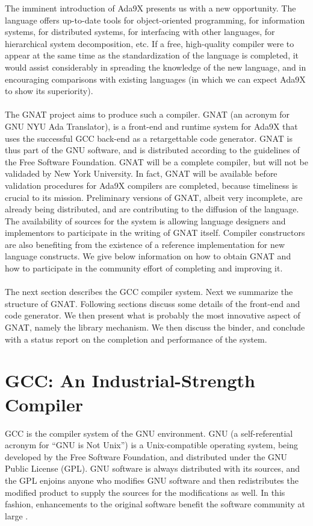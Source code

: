 The imminent introduction of Ada9X presents us with a new opportunity. The
language \cite{rm-9x} offers up-to-date tools for object-oriented
programming, for information systems, for distributed systems, for interfacing
with other languages, for hierarchical system decomposition, etc. If a free,
high-quality compiler were to appear at the same time as the standardization
of the language is completed, it would assist considerably in spreading the
knowledge of the new language, and in encouraging comparisons with existing
languages (in which we can expect Ada9X to show its superiority). 
\\ \\
The GNAT project aims to produce such a compiler. GNAT (an acronym for
GNU NYU Ada Translator), is a front-end and runtime system for Ada9X that
uses the successful GCC back-end as a retargettable code generator. GNAT
is thus part of the GNU software, and is distributed according to the
guidelines of the Free Software Foundation. GNAT will be a complete compiler,
but will not be validaded by New York University. In  fact, GNAT will be
available before validation procedures for Ada9X compilers are completed,
because timeliness is crucial to its mission. Preliminary versions of GNAT,
albeit very incomplete, are already being distributed,  and are contributing
to the diffusion of the language. The availability of sources for the system
is allowing language designers and implementors to participate in the
writing of GNAT itself. Compiler constructors are also benefiting from the
existence of a reference implementation for new language constructs. We
give below information on how to obtain GNAT and how to participate in
the community effort of completing and improving it.
\\ \\
The next section  describes the GCC compiler system. Next we summarize the
structure of GNAT. Following sections discuss some details of the front-end
and code generator. We then present what is probably the most
innovative aspect of GNAT, namely the library mechanism. We then discuss the
binder, and conclude with a status report on the completion and
performance of the system.

\section{GCC: An Industrial-Strength Compiler}

GCC is the compiler system of the GNU environment. GNU (a self-referential
acronym for ``GNU is Not Unix'') is a Unix-compatible operating system,
being developed by the Free Software Foundation, and distributed under the
GNU Public License (GPL). GNU software is always distributed with its sources,
and the GPL enjoins anyone who modifies GNU software and then redistributes
the modified product to supply the sources for the modifications as well. 
In this fashion,  enhancements to the original software benefit the software
community at large \cite{gnu-manual}.

